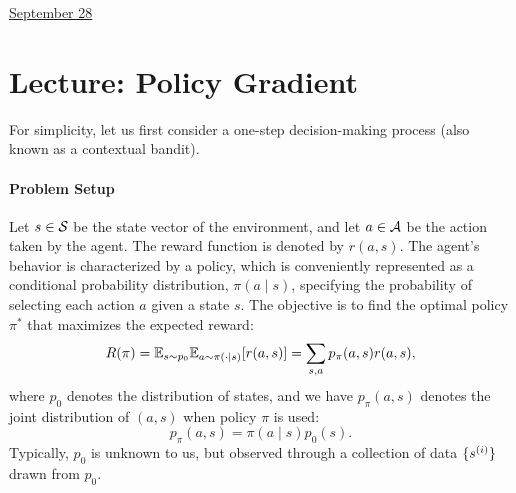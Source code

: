 \documentclass[11pt,letterpaper]{article}
\begin{document}
\href{run:2025-09-28.tex}{\Huge September 28} 

\section{Lecture: Policy Gradient} 


For simplicity, let us first 
consider a one-step decision-making process (also known as a contextual bandit).  




\paragraph{Problem Setup}    
Let $s \in \mathcal{S}$ be the state vector of the environment, and let $a \in \mathcal{A}$ be the action taken by the agent.  
The reward function is denoted by $r(a,s)$.  
%
The agent's behavior is characterized by a policy, which is conveniently represented as a conditional probability distribution,  
$\pi(a \mid s)$,  
specifying the probability of selecting each action $a$ given a state $s$.  
%
The objective is to find the optimal policy $\pi^*$ that maximizes the expected reward:  
\[
R(\pi) = \mathbb{E}_{s\sim p_0}\mathbb{E}_{a\sim \pi(\cdot | s)} [r(a,s)] = \sum_{s,a} p_\pi(a, s) r(a,s),
\]
where $p_0$ denotes the distribution of states,
and we have $p_{\pi}(a,s)$ denotes the joint distribution of $(a,s)$ when policy $\pi$ is used: 
$$
p_\pi(a,s) = \pi(a\mid s) p_0(s). 
$$
Typically, $p_0$ is unknown to us, but observed through a collection of data $\{s^{(i)}\}$ drawn from $p_0$. 


\usetikzlibrary{arrows.meta, positioning, shadows.blur}
\begin{center}
\end{center}
\end{document}
